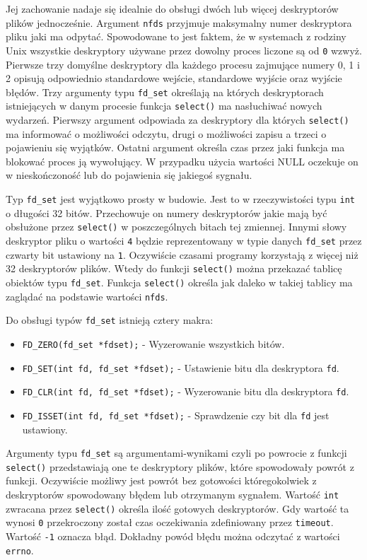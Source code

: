 \documentclass[10pt]{article}
\begin{document}
Jej zachowanie nadaje się idealnie do obsługi dwóch lub więcej deskryptorów plików jednocześnie. Argument \texttt{nfds} przyjmuje maksymalny numer deskryptora pliku jaki ma odpytać. Spowodowane to jest faktem, że w systemach z rodziny Unix wszystkie deskryptory używane przez dowolny proces liczone są od \texttt{0} wzwyż. Pierwsze trzy domyślne deskryptory dla każdego procesu zajmujące numery 0, 1 i 2 opisują odpowiednio standardowe wejście, standardowe wyjście oraz wyjście błędów. Trzy argumenty typu \texttt{fd\_set} określają na których deskryptorach istniejących w danym procesie funkcja \texttt{select()} ma nasłuchiwać nowych wydarzeń. Pierwszy argument odpowiada za deskryptory dla których \texttt{select()} ma informować o możliwości odczytu, drugi o możliwości zapisu a trzeci o pojawieniu się wyjątków. Ostatni argument określa czas przez jaki funkcja ma blokować proces ją wywołujący. W przypadku użycia wartości NULL oczekuje on w nieskończoność lub do pojawienia się jakiegoś sygnału.

Typ \texttt{fd\_set} jest wyjątkowo prosty w budowie. Jest to w rzeczywistości typu \texttt{int} o długości 32 bitów. Przechowuje on numery deskryptorów jakie mają być obsłużone przez \texttt{select()} w poszczególnych bitach tej zmiennej. Innymi słowy deskryptor pliku o wartości \texttt{4} będzie reprezentowany w typie danych \texttt{fd\_set} przez czwarty bit ustawiony na \texttt{1}. Oczywiście czasami programy korzystają z więcej niż 32 deskryptorów plików. Wtedy do funkcji \texttt{select()} można przekazać tablicę obiektów typu \texttt{fd\_set}. Funkcja \texttt{select()} określa jak daleko w takiej tablicy ma zaglądać na podstawie wartości \texttt{nfds}.

Do obsługi typów \texttt{fd\_set} istnieją cztery makra:

\begin{itemize}
\itemsep1pt\parskip0pt
\item
  \texttt{FD\_ZERO(fd\_set *fdset);} - Wyzerowanie wszystkich bitów.
\item
  \texttt{FD\_SET(int fd, fd\_set *fdset);} - Ustawienie bitu dla
  deskryptora \texttt{fd}.
\item
  \texttt{FD\_CLR(int fd, fd\_set *fdset);} - Wyzerowanie bitu dla
  deskryptora \texttt{fd}.
\item
  \texttt{FD\_ISSET(int fd, fd\_set *fdset);} - Sprawdzenie czy bit dla \texttt{fd} jest ustawiony.
\end{itemize}

Argumenty typu \texttt{fd\_set} są argumentami-wynikami czyli po powrocie z funkcji \texttt{select()} przedstawiają one te deskryptory plików, które spowodowały powrót z funkcji. Oczywiście możliwy jest powrót bez gotowości któregokolwiek z deskryptorów spowodowany błędem lub otrzymanym sygnałem. Wartość \texttt{int} zwracana przez \texttt{select()} określa ilość gotowych deskryptorów. Gdy wartość ta wynosi \texttt{0} przekroczony został czas oczekiwania zdefiniowany przez \texttt{timeout}. Wartość \texttt{-1} oznacza błąd. Dokładny powód błędu można odczytać z wartości \texttt{errno}.
\end{document}
